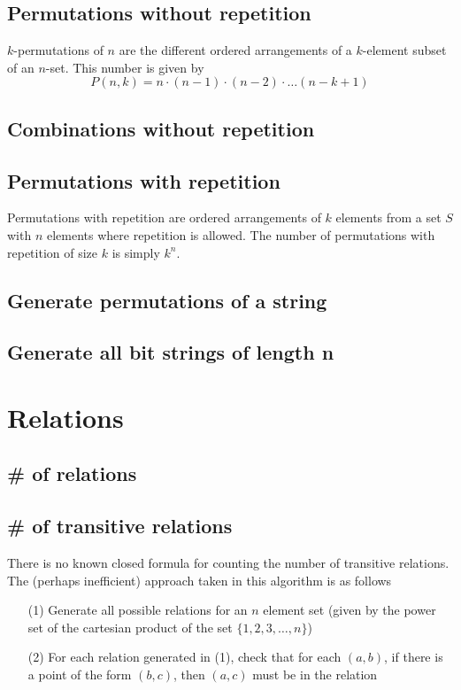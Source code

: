 \documentclass{article}
\begin{document}
\subsection{Permutations without repetition}
$k$-permutations of $n$ are the different ordered arrangements of a $k$-element subset of an $n$-set. This number is given by
\[P(n,k) = n \cdot (n-1) \cdot (n-2) \cdot \dots (n-k+1)\]
\subsection{Combinations without repetition}

\subsection{Permutations with repetition}
Permutations with repetition are ordered arrangements of $k$ elements from a set $S$ with $n$ elements where repetition is allowed. The number of permutations with repetition of size $k$ is simply $k^n$.
\subsection{Generate permutations of a string}
\subsection{Generate all bit strings of length n}

\section{Relations}
\subsection{\# of relations}
\subsection{\# of transitive relations}
There is no known closed formula for counting the number of transitive relations. The (perhaps inefficient) approach taken in this algorithm is as follows
\begin{enumerate}
\item[(1)] Generate all possible relations for an $n$ element set (given by the power set of the cartesian product of the set $\{1,2,3,\dots,n\}$)
\item[(2)] For each relation generated in (1), check that for each $(a,b)$, if there is a point of the form $(b,c)$, then $(a,c)$ must be in the relation
\end{enumerate}
\end{document}
